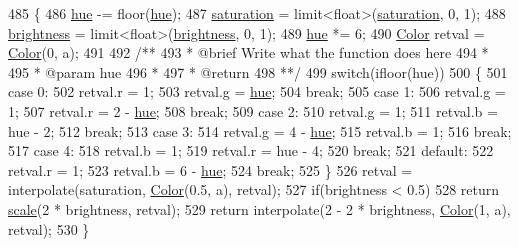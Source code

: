 \begin{DoxyCode}
485 \{
486     \hyperlink{structColor_a183b93e13e713514a4bee5fdbd8a5a9b}{hue} -= floor(\hyperlink{structColor_a183b93e13e713514a4bee5fdbd8a5a9b}{hue});
487     \hyperlink{structColor_a225af5fdfba5d0d6d4d660a1f4c9a509}{saturation} = limit<float>(\hyperlink{structColor_a225af5fdfba5d0d6d4d660a1f4c9a509}{saturation}, 0, 1);
488     \hyperlink{structColor_a7eb1a828a3e3c6a3c5e5843a0413f485}{brightness} = limit<float>(\hyperlink{structColor_a7eb1a828a3e3c6a3c5e5843a0413f485}{brightness}, 0, 1);
489     \hyperlink{structColor_a183b93e13e713514a4bee5fdbd8a5a9b}{hue} *= 6;
490     \hyperlink{structColor}{Color} retval = \hyperlink{structColor_a9a742cbe9f9f4037f5d9f4e81a9b2428}{Color}(0, a);
491 \textcolor{comment}{}
492 \textcolor{comment}{    /**}
493 \textcolor{comment}{     * @brief Write what the function does here}
494 \textcolor{comment}{     *}
495 \textcolor{comment}{     * @param hue}
496 \textcolor{comment}{     *}
497 \textcolor{comment}{     * @return}
498 \textcolor{comment}{     **/}
499     \textcolor{keywordflow}{switch}(ifloor(hue))
500     \{
501         \textcolor{keywordflow}{case} 0:
502             retval.r = 1;
503             retval.g = \hyperlink{structColor_a183b93e13e713514a4bee5fdbd8a5a9b}{hue};
504             \textcolor{keywordflow}{break};
505         \textcolor{keywordflow}{case} 1:
506             retval.g = 1;
507             retval.r = 2 - \hyperlink{structColor_a183b93e13e713514a4bee5fdbd8a5a9b}{hue};
508             \textcolor{keywordflow}{break};
509         \textcolor{keywordflow}{case} 2:
510             retval.g = 1;
511             retval.b = hue - 2;
512             \textcolor{keywordflow}{break};
513         \textcolor{keywordflow}{case} 3:
514             retval.g = 4 - \hyperlink{structColor_a183b93e13e713514a4bee5fdbd8a5a9b}{hue};
515             retval.b = 1;
516             \textcolor{keywordflow}{break};
517         \textcolor{keywordflow}{case} 4:
518             retval.b = 1;
519             retval.r = hue - 4;
520             \textcolor{keywordflow}{break};
521         \textcolor{keywordflow}{default}:
522             retval.r = 1;
523             retval.b = 6 - \hyperlink{structColor_a183b93e13e713514a4bee5fdbd8a5a9b}{hue};
524             \textcolor{keywordflow}{break};
525     \}
526     retval = interpolate(saturation, \hyperlink{structColor_a9a742cbe9f9f4037f5d9f4e81a9b2428}{Color}(0.5, a), retval);
527     \textcolor{keywordflow}{if}(brightness < 0.5)
528         \textcolor{keywordflow}{return} \hyperlink{structColor_ac863751b53da826f397a0a3e1791214c}{scale}(2 * brightness, retval);
529     \textcolor{keywordflow}{return} interpolate(2 - 2 * brightness, \hyperlink{structColor_a9a742cbe9f9f4037f5d9f4e81a9b2428}{Color}(1, a), retval);
530 \}
\end{DoxyCode}
